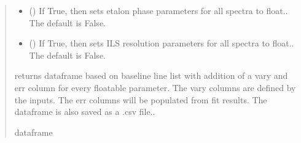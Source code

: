 \documentclass[letterpaper,10pt,english]{sphinxmanual}
\begin{document}
\begin{fulllineitems}
\begin{fulllineitems}
\begin{quote}
\begin{description}
\begin{itemize}
\item {} 
\sphinxAtStartPar
{} (\sphinxstyleliteralemphasis{\sphinxupquote{, }}) \textendash{} If True, then sets etalon phase parameters for all spectra to float.. The default is False.

\item {} 
\sphinxAtStartPar
{} (\sphinxstyleliteralemphasis{\sphinxupquote{, }}) \textendash{} If True, then sets ILS resolution parameters for all spectra to float.. The default is False.

\end{itemize}

\sphinxAtStartPar
{} \textendash{} returns dataframe based on baseline line list with addition of a vary and err column for every floatable parameter.  The vary columns are defined by the inputs.  The err columns will be populated from fit results.  The dataframe is also saved as a .csv file..

\sphinxAtStartPar
dataframe

\end{description}\end{quote}

\end{fulllineitems}



\end{fulllineitems}
\end{document}
